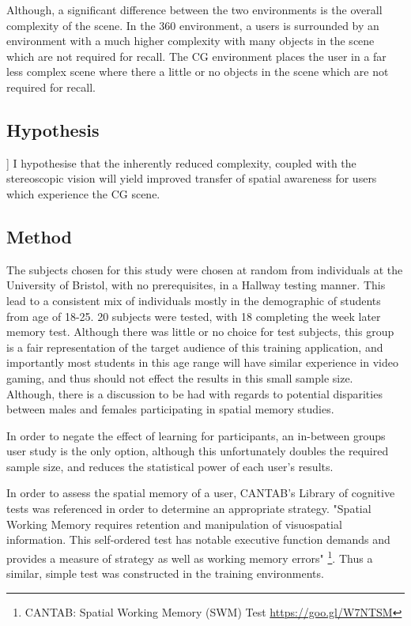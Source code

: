 \documentclass[ %
                    author={Elis Jones},
                supervisor={Dr. Kirsten Cater},
                    degree={BSc},
                     title={The Effect of Presentation Medium on Spatial Cognition},
                  subtitle={in the Virtual Environment},
                      year={2018} ]{dissertation}
\begin{document}
Although, a significant difference between the two environments is the overall complexity of the scene. In the 360 environment, a users is surrounded by an environment with a much higher complexity with many objects in the scene which are not required for recall. The CG environment places the user in a far less complex scene where there a little or no objects in the scene which are not required for recall.

\subsection{Hypothesis}]
I hypothesise that the inherently reduced complexity, coupled with the stereoscopic vision will yield improved transfer of spatial awareness for users which experience the CG scene.


\subsection{Method}\label{cantab}
The subjects chosen for this study were chosen at random from individuals at the University of Bristol, with no prerequisites, in a Hallway testing manner. This lead to a consistent mix of individuals mostly in the demographic of students from age of 18-25. 20 subjects were tested, with 18 completing the week later memory test. Although there was little or no choice for test subjects, this group is a fair representation of the target audience of this training application, and importantly most students in this age range will have similar experience in video gaming, and thus should not effect the results in this small sample size. Although, there is a discussion to be had with regards to potential disparities between males and females participating in spatial memory studies. 

In order to negate the effect of learning for participants, an in-between groups user study is the only option, although this unfortunately doubles the required sample size, and reduces the statistical power of  each user's results. 

In order to assess the spatial memory of a user, CANTAB's Library of cognitive tests was referenced in order to determine an appropriate strategy. "Spatial Working Memory requires retention and manipulation of visuospatial information. This self-ordered test has notable executive function demands and provides a measure of strategy as well as working memory errors" \footnote{ CANTAB: Spatial Working Memory (SWM) Test \url{https://goo.gl/W7NTSM}}. Thus a similar, simple test was constructed in the training environments. 
\end{document}
